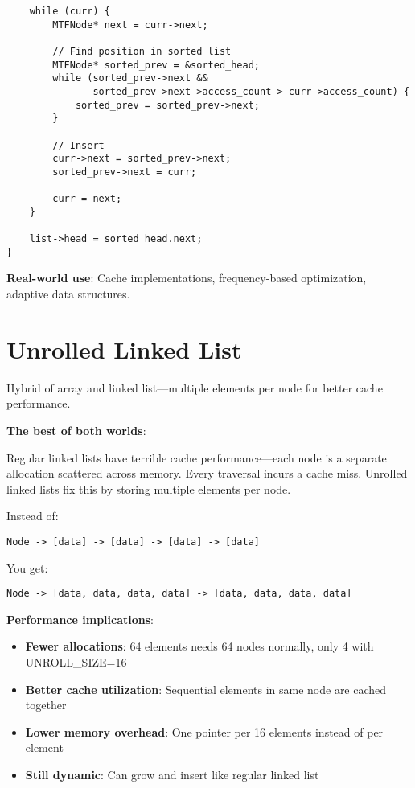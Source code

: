 \begin{lstlisting}
    while (curr) {
        MTFNode* next = curr->next;

        // Find position in sorted list
        MTFNode* sorted_prev = &sorted_head;
        while (sorted_prev->next &&
               sorted_prev->next->access_count > curr->access_count) {
            sorted_prev = sorted_prev->next;
        }

        // Insert
        curr->next = sorted_prev->next;
        sorted_prev->next = curr;

        curr = next;
    }

    list->head = sorted_head.next;
}
\end{lstlisting}

\textbf{Real-world use}: Cache implementations, frequency-based optimization, adaptive data structures.

\section{Unrolled Linked List}

Hybrid of array and linked list—multiple elements per node for better cache performance.

\textbf{The best of both worlds}:

Regular linked lists have terrible cache performance—each node is a separate allocation scattered across memory. Every traversal incurs a cache miss. Unrolled linked lists fix this by storing multiple elements per node.

Instead of:
\begin{verbatim}
Node -> [data] -> [data] -> [data] -> [data]
\end{verbatim}

You get:
\begin{verbatim}
Node -> [data, data, data, data] -> [data, data, data, data]
\end{verbatim}

\textbf{Performance implications}:

\begin{itemize}
    \item \textbf{Fewer allocations}: 64 elements needs 64 nodes normally, only 4 with UNROLL\_SIZE=16
    \item \textbf{Better cache utilization}: Sequential elements in same node are cached together
    \item \textbf{Lower memory overhead}: One pointer per 16 elements instead of per element
    \item \textbf{Still dynamic}: Can grow and insert like regular linked list
\end{itemize}

